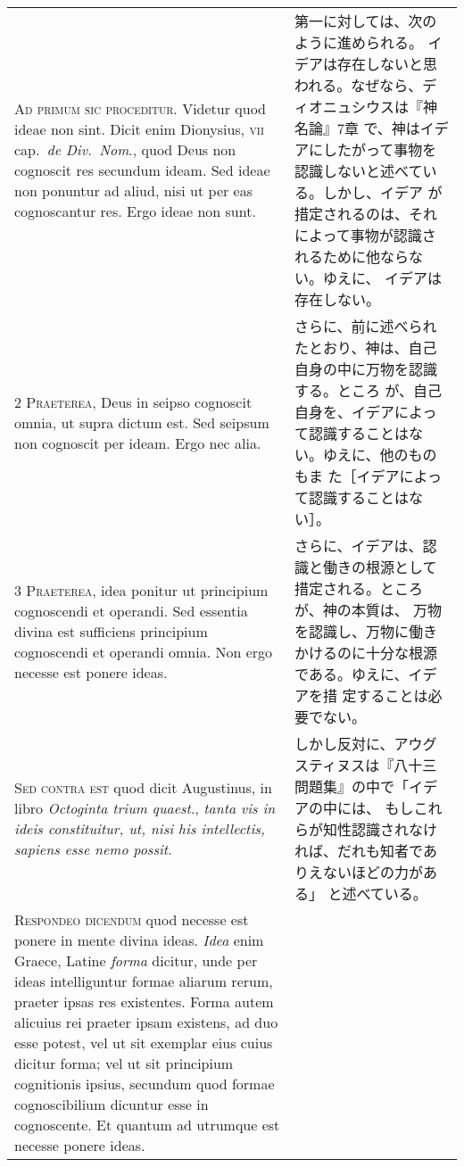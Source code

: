 \documentclass[10pt]{jsarticle} %
\begin{document}
\begin{longtable}{p{21em}p{21em}}


{\huge A}{\scshape d primum sic proceditur}. Videtur quod ideae non
sint. Dicit enim Dionysius, {\scshape vii} cap.~{\itshape de Div.~Nom}.,
quod Deus non cognoscit res secundum ideam. Sed ideae non ponuntur ad
aliud, nisi ut per eas cognoscantur res. Ergo ideae non sunt.

&
第一に対しては、次のように進められる。
イデアは存在しないと思われる。なぜなら、ディオニュシウスは『神名論』7章
 で、神はイデアにしたがって事物を認識しないと述べている。しかし、イデア
 が措定されるのは、それによって事物が認識されるために他ならない。ゆえに、
 イデアは存在しない。


\\


{\scshape 2 Praeterea}, Deus in seipso cognoscit omnia,
ut supra dictum est. Sed seipsum non cognoscit per ideam. Ergo nec alia.

&

さらに、前に述べられたとおり、神は、自己自身の中に万物を認識する。ところ
 が、自己自身を、イデアによって認識することはない。ゆえに、他のものもま
 た［イデアによって認識することはない］。

\\


{\scshape 3 Praeterea}, idea ponitur ut principium
cognoscendi et operandi. Sed essentia divina est sufficiens principium
cognoscendi et operandi omnia. Non ergo necesse est ponere ideas.

&
さらに、イデアは、認識と働きの根源として措定される。ところが、神の本質は、
 万物を認識し、万物に働きかけるのに十分な根源である。ゆえに、イデアを措
 定することは必要でない。


\\


{\scshape Sed contra est} quod dicit Augustinus, in libro {\itshape
Octoginta trium quaest}., {\itshape tanta vis in ideis constituitur, ut,
nisi his intellectis, sapiens esse nemo possit}.

&

しかし反対に、アウグスティヌスは『八十三問題集』の中で「イデアの中には、
 もしこれらが知性認識されなければ、だれも知者でありえないほどの力がある」
 と述べている。

\\


{\scshape Respondeo dicendum} quod necesse est ponere in
mente divina ideas. {\itshape Idea} enim Graece, Latine {\itshape forma} dicitur, unde per
ideas intelliguntur formae aliarum rerum, praeter ipsas res
existentes. Forma autem alicuius rei praeter ipsam existens, ad duo esse
potest, vel ut sit exemplar eius cuius dicitur forma; vel ut sit
principium cognitionis ipsius, secundum quod formae cognoscibilium
dicuntur esse in cognoscente. Et quantum ad utrumque est necesse ponere
ideas. 



\end{longtable}
\end{document}
